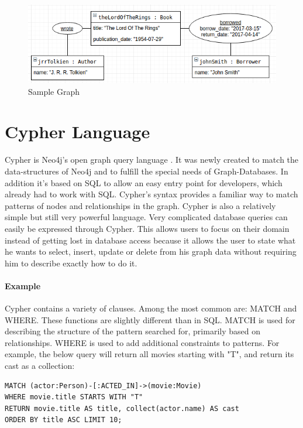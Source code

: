 \begin{figure}[H]
	\includegraphics[width=\linewidth,keepaspectratio]{images/neo4j/data-structure/sample-graph.png}
	\caption{Sample Graph}
\end{figure}

\section{Cypher Language}

Cypher is Neo4j's open graph query language \cite["Cypher Query Language", para. 1]{NeoTechnologyInc.2017e}. It was newly created to match the data-structures of Neo4j and to fulfill the special needs of Graph-Databases.
In addition it's based on SQL to allow an easy entry point for developers, which already had to work with SQL. \cite["About Cypher", para. 1]{NeoTechnologyInc.2017d}
Cypher's syntax provides a familiar way to match patterns of nodes and relationships in the graph.
Cypher is also a relatively simple but still very powerful language. \cite["Fazit", para. 1]{Mahler.2014}
Very complicated database queries can easily be expressed through Cypher.
This allows users to focus on their domain instead of getting lost in database access because it allows the user to state what he wants to select, insert, update or delete from his graph data without requiring him to describe exactly how to do it.

\paragraph{Example}

Cypher contains a variety of clauses. 
Among the most common are: MATCH and WHERE. \cite["A few words about Cypher", para. 3]{NeoTechnologyInc.2017f}
These functions are slightly different than in SQL.
MATCH is used for describing the structure of the pattern searched for, primarily based on relationships.
WHERE is used to add additional constraints to patterns.
For example, the below query will return all movies starting with "T", and return its cast as a collection:
\begin{lstlisting}[frame=single, caption=Cypher Example, label=cypherexample]
MATCH (actor:Person)-[:ACTED_IN]->(movie:Movie)  
WHERE movie.title STARTS WITH "T"  
RETURN movie.title AS title, collect(actor.name) AS cast  
ORDER BY title ASC LIMIT 10;
\end{lstlisting}

